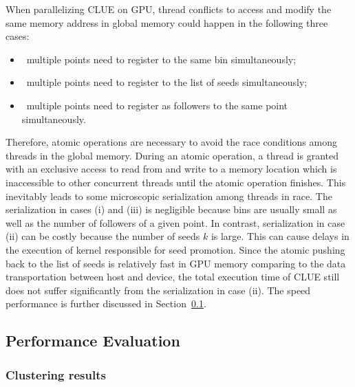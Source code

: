 When parallelizing CLUE on GPU, thread conflicts to access and modify the same memory address in global memory could happen in the following three cases:

\begin{itemize}
    \item ~multiple points need to register to the same bin simultaneously;
    \item ~multiple points need to register to the list of seeds simultaneously;
    \item ~multiple points need to register as followers to the same point simultaneously.
\end{itemize}


\noindent Therefore, atomic operations are necessary to avoid the race conditions among threads in the global memory. During an atomic operation, a thread is granted with an exclusive access to read from and write to a memory location which is inaccessible to other concurrent threads until the atomic operation finishes. 
This inevitably leads to some microscopic serialization among threads in race. The serialization in cases (i) and (iii) is negligible because bins are usually small as well as the number of followers of a given point. In contrast, serialization in case (ii) can be costly because the number of seeds $k$ is large. This can cause delays in the execution of kernel responsible for seed promotion. Since the atomic pushing back to the list of seeds is relatively fast in GPU memory comparing to the data transportation between host and device, the total execution time of CLUE still does not suffer significantly from the serialization in case (ii). The speed performance is further discussed in Section~\ref{sec:performance}.







\subsection{Performance Evaluation}
\label{sec:performance}

\subsubsection{Clustering results}
\label{sec:performance:clusteringResults}

